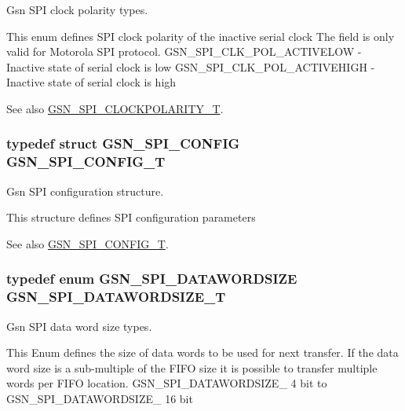 Gsn SPI clock polarity types. 

This enum defines SPI clock polarity of the inactive serial clock The field is only valid for Motorola SPI protocol. GSN\_\-SPI\_\-CLK\_\-POL\_\-ACTIVELOW -\/ Inactive state of serial clock is low GSN\_\-SPI\_\-CLK\_\-POL\_\-ACTIVEHIGH -\/ Inactive state of serial clock is high

\begin{DoxySeeAlso}{See also}
\hyperlink{a00655_ga40c914db809ec79fd3a564dda8364aea}{GSN\_\-SPI\_\-CLOCKPOLARITY\_\-T}. 
\end{DoxySeeAlso}
\hypertarget{a00655_ga582e2b85ccb404b546fbe5a27f2113cb}{
\subsubsection[{GSN\_\-SPI\_\-CONFIG\_\-T}]{\setlength{\rightskip}{0pt plus 5cm}typedef struct {\bf GSN\_\-SPI\_\-CONFIG}  {\bf GSN\_\-SPI\_\-CONFIG\_\-T}}}
\label{a00655_ga582e2b85ccb404b546fbe5a27f2113cb}


Gsn SPI configuration structure. 

This structure defines SPI configuration parameters

\begin{DoxySeeAlso}{See also}
\hyperlink{a00655_ga582e2b85ccb404b546fbe5a27f2113cb}{GSN\_\-SPI\_\-CONFIG\_\-T}. 
\end{DoxySeeAlso}
\hypertarget{a00655_ga63cbe81427185213bde26b93dde72747}{
\subsubsection[{GSN\_\-SPI\_\-DATAWORDSIZE\_\-T}]{\setlength{\rightskip}{0pt plus 5cm}typedef enum {\bf GSN\_\-SPI\_\-DATAWORDSIZE}  {\bf GSN\_\-SPI\_\-DATAWORDSIZE\_\-T}}}
\label{a00655_ga63cbe81427185213bde26b93dde72747}


Gsn SPI data word size types. 

This Enum defines the size of data words to be used for next transfer. If the data word size is a sub-\/multiple of the FIFO size it is possible to transfer multiple words per FIFO location. GSN\_\-SPI\_\-DATAWORDSIZE\_ 4 bit to GSN\_\-SPI\_\-DATAWORDSIZE\_ 16 bit

